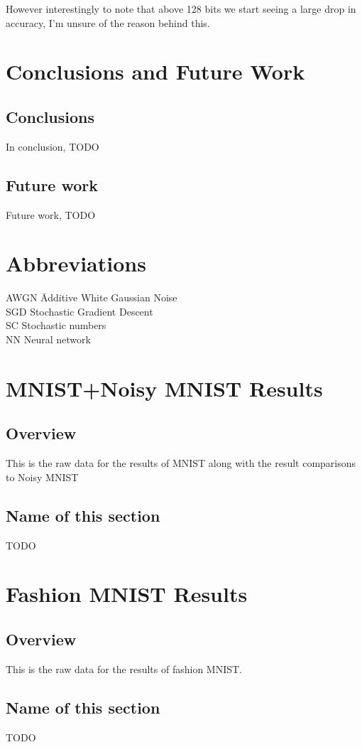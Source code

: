 \documentclass[a4paper,twoside,phd]{BYUPhys}
\begin{document}
However interestingly to note that above 128 bits we start seeing a large drop in accuracy, I'm unsure of the reason behind this.

\chapter{Conclusions and Future Work}
\label{chap:Conclusions}

\section{Conclusions}
\label{sec:ConclusionsConclusions}
In conclusion, TODO

\section{Future work}
\label{sec:ConclustionsFuturework}
Future work, TODO

\clearemptydoublepage
\chapter{Abbreviations}
\label{chap:abbreviations}

\begin{tabbing}

AWGN \qquad \qquad \= Additive White Gaussian Noise\\
SGD \> Stochastic Gradient Descent\\
SC \> Stochastic numbers\\
NN \> Neural network \\
\end{tabbing}


\appendix
\chapter{MNIST+Noisy MNIST Results}
\section{Overview}
This is the raw data for the results of MNIST along with the result comparisons to Noisy MNIST
\section{Name of this section}
TODO
\chapter{Fashion MNIST Results}
\section{Overview}
This is the raw data for the results of fashion MNIST.
\section{Name of this section}
TODO

%

%

%
\end{document}

